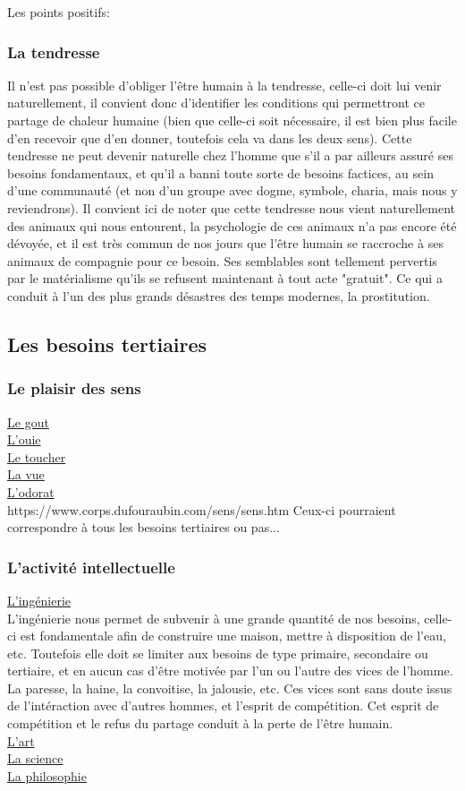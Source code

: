 \documentclass[11pt]{article} %
\begin{document}
Les points positifs:


\subsubsection{La tendresse}
Il n'est pas possible d'obliger l'être humain à la tendresse, celle-ci doit lui venir naturellement, il convient donc d'identifier les conditions qui permettront ce partage de chaleur humaine (bien que celle-ci soit nécessaire, il est bien plus facile d'en recevoir que d'en donner, toutefois cela va dans les deux sens).
Cette tendresse ne peut devenir naturelle chez l'homme que s'il a par ailleurs assuré ses besoins fondamentaux, et qu'il a banni toute sorte de besoins factices, au sein d'une communauté (et non d'un groupe avec dogme, symbole, charia, mais nous y reviendrons). 
Il convient ici de noter que cette tendresse nous vient naturellement des animaux qui nous entourent, la psychologie de ces animaux n'a pas encore été dévoyée, et il est très commun de nos jours que l'être humain se raccroche à ses animaux de compagnie pour ce besoin.
Ses semblables sont tellement pervertis par le matérialisme qu'ils se refusent maintenant à tout acte "gratuit". Ce qui a conduit à l'un des plus grands désastres des temps modernes, la prostitution.

\subsection{Les besoins tertiaires}

\subsubsection{Le plaisir des sens}
\underline{Le gout}\\
\underline{L'ouie}\\
\underline{Le toucher}\\
\underline{La vue}\\
\underline{L'odorat}\\
https://www.corps.dufouraubin.com/sens/sens.htm
Ceux-ci pourraient correspondre à tous les besoins tertiaires ou pas...

\subsubsection{L'activité intellectuelle}
\underline{L'ingénierie}\\
L'ingénierie nous permet de subvenir à une grande quantité de nos besoins, celle-ci est fondamentale afin de construire une maison, mettre à disposition de l'eau, etc. Toutefois elle doit se limiter aux besoins de type primaire, secondaire ou tertiaire, et en aucun cas d'être motivée par l'un ou l'autre des vices de l'homme. La paresse, la haine, la convoitise, la jalousie, etc. Ces vices sont sans doute issus de l'intéraction avec d'autres hommes, et l'esprit de compétition. Cet esprit de compétition et le refus du partage conduit à la perte de l'être humain.\\
\underline{L'art}\\
\underline{La science}\\
\underline{La philosophie}\\
\end{document}
